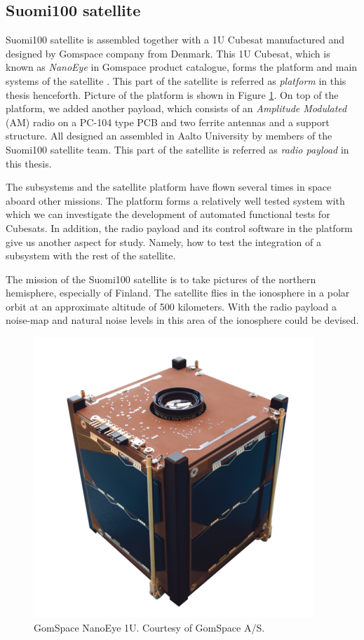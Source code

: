 \documentclass[english,12pt,a4paper,pdftex,elec,utf8]{aaltothesis}
\begin{document}
\subsection{Suomi100 satellite}
Suomi100 satellite is assembled together with a 1U Cubesat manufactured and designed by Gomspace company from Denmark. This 1U Cubesat, which is known as \textit{NanoEye} in Gomspace product catalogue, forms the platform and main systems of the satellite \cite{gomspaceweb}. This part of the satellite is referred as \textit{platform} in this thesis henceforth. Picture of the platform is shown in Figure \ref{nanoeye}. On top of the platform, we added another payload, which consists of an \textit{Amplitude Modulated} (AM) radio on a PC-104 type PCB and two ferrite antennas and a support structure. All designed an assembled in Aalto University by members of the Suomi100 satellite team. This part of the satellite is referred as \textit{radio payload} in this thesis.\par
The subsystems and the satellite platform have flown several times in space aboard other missions. The platform forms a relatively well tested system with which we can investigate the development of automated functional tests for Cubesats. In addition, the radio payload and its control software in the platform give us another aspect for study. Namely, how to test the integration of a subsystem with the rest of the satellite.\par
The mission of the Suomi100 satellite is to take pictures of the northern hemisphere, especially of Finland. The satellite flies in the ionosphere in a polar orbit at an approximate altitude of 500 kilometers. With the radio payload a noise-map and natural noise levels in this area of the ionosphere could be devised. 
\begin{center}
\begin{figure}[h!]
\centering
\includegraphics[scale=0.5]{nanoeye}
\caption{GomSpace NanoEye 1U. Courtesy of GomSpace A/S. \cite{gomspaceweb}}
\label{nanoeye}
\end{figure}
\end{center}
\end{document}
